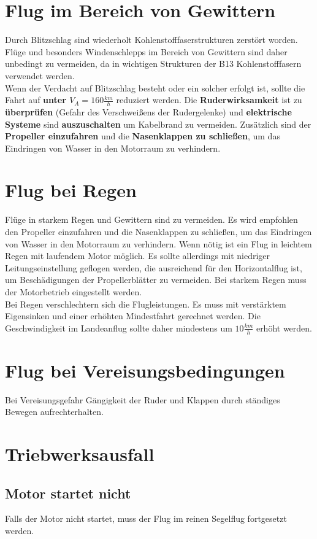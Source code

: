 \section{Flug im Bereich von Gewittern}
Durch Blitzschlag sind wiederholt Kohlenstofffaserstrukturen zerstört worden. Flüge und besonders Windenschlepps im Bereich von Gewittern sind daher unbedingt zu vermeiden, da in wichtigen Strukturen der B13 Kohlenstofffasern verwendet werden.\\
Wenn der Verdacht auf Blitzschlag besteht oder ein solcher erfolgt ist, sollte die Fahrt auf \textbf{unter $V_A=160\frac{km}{h}$} reduziert werden. Die \textbf{Ruderwirksamkeit} ist zu \textbf{überprüfen} (Gefahr des Verschweißens der Rudergelenke) und \textbf{elektrische Systeme} sind \textbf{auszuschalten} um Kabelbrand zu vermeiden.
Zusätzlich sind der \textbf{Propeller einzufahren} und die \textbf{Nasenklappen zu schließen}, um das Eindringen von Wasser in den Motorraum zu verhindern.



\section{Flug bei Regen}
Flüge in starkem Regen und Gewittern sind zu vermeiden. Es wird empfohlen den Propeller einzufahren und die Nasenklappen zu schließen, um das Eindringen von Wasser in den Motorraum zu verhindern.
Wenn nötig ist ein Flug in leichtem Regen mit laufendem Motor möglich. Es sollte allerdings mit niedriger Leitungseinstellung geflogen werden, die ausreichend für den Horizontalflug ist, um Beschädigungen der Propellerblätter zu vermeiden. Bei starkem Regen muss der Motorbetrieb eingestellt werden. \\

Bei Regen verschlechtern sich die Flugleistungen. Es muss mit verstärktem Eigensinken und einer erhöhten Mindestfahrt gerechnet werden. Die Geschwindigkeit im Landeanflug sollte daher mindestens um $10 \frac{km}{h}$ erhöht werden. 

\section{Flug bei Vereisungsbedingungen}
Bei Vereisungsgefahr Gängigkeit der Ruder und Klappen durch ständiges Bewegen aufrechterhalten.
\newpage
\section{Triebwerksausfall}
\subsection{Motor startet nicht}
Falls der Motor nicht startet, muss der Flug im reinen Segelflug fortgesetzt werden. \\

